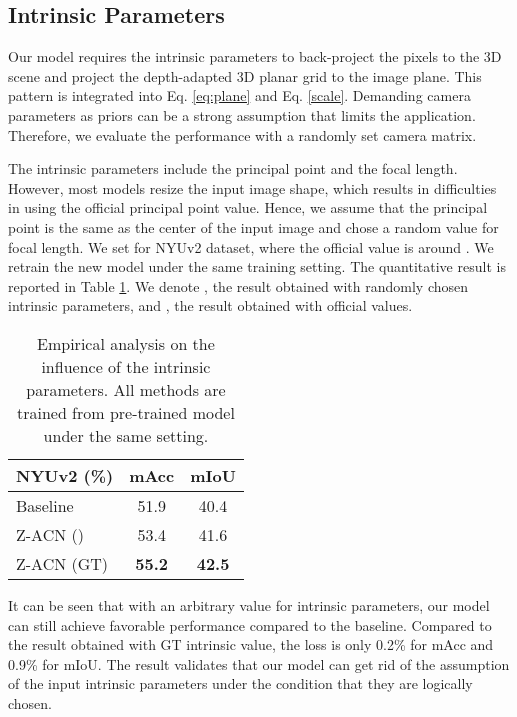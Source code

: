 \documentclass[lettersize,journal]{IEEEtran}
\begin{document}
\subsection{Intrinsic Parameters}

Our model requires the intrinsic parameters to back-project the pixels to the 3D scene and project the depth-adapted 3D planar grid to the image plane. This pattern is integrated into Eq. \ref{eq:plane} and Eq. \ref{scale}. Demanding camera parameters as priors can be a strong assumption that limits the application. Therefore, we evaluate the performance with a randomly set camera matrix.

The intrinsic parameters include the principal point and the focal length. However, most models resize the input image shape, which results in difficulties in using the official principal point value. Hence, we assume that the principal point is the same as the center of the input image and chose a random value for focal length. We set  for NYUv2 dataset, where the official value is around . We retrain the new model under the same training setting. The quantitative result is reported in Table \ref{intrinsic}. We denote , the result obtained with randomly chosen intrinsic parameters, and , the result obtained with official values.

\begin{table}[t]
\centering
\setlength\tabcolsep{10pt}
\setlength\extrarowheight{0pt}
\caption{Empirical analysis on the influence of the intrinsic parameters. All methods are trained from pre-trained model under the same setting.}
\begin{tabular}[ht]{ l c c }
\hline

\hline
NYUv2 (\%)    & mAcc   &  mIoU    \\
\hline
Baseline &  51.9 &  40.4  \\
Z-ACN () &53.4 &  41.6\\
Z-ACN (GT) & \textbf{55.2} &  \textbf{42.5}  \\
\hline

\hline
\end{tabular}

\label{intrinsic}
\end{table}

It can be seen that with an arbitrary value for intrinsic parameters, our model can still achieve favorable performance compared to the baseline. Compared to the result obtained with GT intrinsic value, the loss is only 0.2\% for mAcc and 0.9\% for mIoU. The result validates that our model can get rid of the assumption of the input intrinsic parameters under the condition that they are logically chosen.
\end{document}

